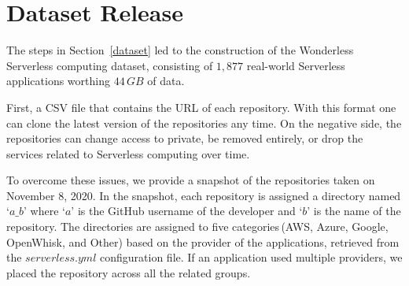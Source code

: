 
\section{Dataset Release}
\label{schema}

The steps in Section~\ref{dataset} led to the construction of the
 Wonderless Serverless computing dataset, consisting of $1,877$
real-world Serverless applications worthing $44 \, GB$ of data. 

First, a CSV file that contains the URL of each repository. 
With this format one can clone the latest version of the repositories any time. 
On the negative side, the repositories can change access to private, 
be removed entirely, or drop the services related to Serverless computing 
over time. 

To overcome these issues, we provide a snapshot of the 
repositories taken on November 8, 2020. 
In the snapshot, each repository is assigned a directory named `$a\_b$' 
where `$a$' is the GitHub username of the developer and `$b$' is the name of the repository. 
The directories are assigned to five categories\,(AWS, Azure, Google, OpenWhisk, and Other) 
based on the provider of the applications, retrieved from the $serverless.yml$ configuration file. 
If an application used multiple providers, we placed the repository across 
all the related groups. 
